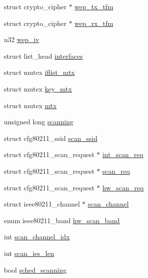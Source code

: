 \begin{DoxyCompactItemize}
\item 
struct crypto\-\_\-cipher $\ast$ \hyperlink{structieee80211__local_ab554bf57d377855ad08d970f9e395ad0}{wep\-\_\-tx\-\_\-tfm}
\item 
struct crypto\-\_\-cipher $\ast$ \hyperlink{structieee80211__local_a993e1c97083f7fe3b90b9da910d72bd7}{wep\-\_\-rx\-\_\-tfm}
\item 
u32 \hyperlink{structieee80211__local_ac63790cf9fa02ac7ac0c4282cfe5b041}{wep\-\_\-iv}
\item 
struct list\-\_\-head \hyperlink{structieee80211__local_af269ec693ad97d77fcfb0decd1c9edc7}{interfaces}
\item 
struct mutex \hyperlink{structieee80211__local_a64a494bea7f67ad34d7e3e06f47519fa}{iflist\-\_\-mtx}
\item 
struct mutex \hyperlink{structieee80211__local_aa4d4909b9696da095fd82e003eee670b}{key\-\_\-mtx}
\item 
struct mutex \hyperlink{structieee80211__local_a06f637951b74c996f2e4987a7be1dbdd}{mtx}
\item 
unsigned long \hyperlink{structieee80211__local_aa4734c7bf0bba0e87ccf874423c3c79a}{scanning}
\item 
struct cfg80211\-\_\-ssid \hyperlink{structieee80211__local_aa25532a782ada88d435b24dfda931173}{scan\-\_\-ssid}
\item 
struct cfg80211\-\_\-scan\-\_\-request $\ast$ \hyperlink{structieee80211__local_a8468ec1a7c0d94fbdc5cb8c1e030051e}{int\-\_\-scan\-\_\-req}
\item 
struct cfg80211\-\_\-scan\-\_\-request $\ast$ \hyperlink{structieee80211__local_aaa4fd1e0ca28860a5750a01837c6c325}{scan\-\_\-req}
\item 
struct cfg80211\-\_\-scan\-\_\-request $\ast$ \hyperlink{structieee80211__local_aec89fecf81c37f8d260d6d2e2697a463}{hw\-\_\-scan\-\_\-req}
\item 
struct ieee80211\-\_\-channel $\ast$ \hyperlink{structieee80211__local_a0fcd0e60e46da373ab6002985dfa2751}{scan\-\_\-channel}
\item 
enum ieee80211\-\_\-band \hyperlink{structieee80211__local_aba68e760b61a0482eed83d42e9df3f4d}{hw\-\_\-scan\-\_\-band}
\item 
int \hyperlink{structieee80211__local_a047d647546c287f0ae0ab2b56b09ed66}{scan\-\_\-channel\-\_\-idx}
\item 
int \hyperlink{structieee80211__local_a68131071a0fe62e850afc46f0a7ef6a1}{scan\-\_\-ies\-\_\-len}
\item 
bool \hyperlink{structieee80211__local_abd8e66f3e46d5bb5d08224d0960a29b6}{sched\-\_\-scanning}

\end{DoxyCompactItemize}
